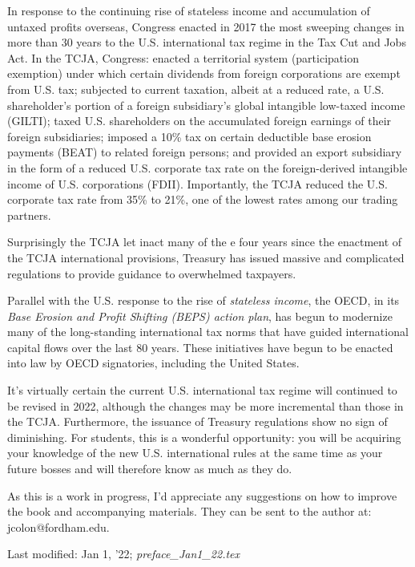 In response to the continuing rise of stateless income and accumulation of untaxed profits overseas, Congress enacted  in 2017 the most sweeping changes in more than 30 years to the U.S. international tax regime in the Tax Cut and Jobs Act.  In the TCJA, Congress: enacted a territorial system (participation exemption) under which certain dividends from foreign corporations are exempt from U.S. tax; subjected to current taxation, albeit at a reduced rate, a U.S. shareholder's portion of a foreign subsidiary's global intangible low-taxed income (GILTI); taxed U.S. shareholders on the accumulated foreign earnings of their foreign subsidiaries; imposed a 10\% tax on certain deductible base erosion payments (BEAT) to related foreign persons; and provided an export subsidiary in the form of a reduced U.S. corporate tax rate on the foreign-derived intangible income of U.S. corporations (FDII).  Importantly, the TCJA reduced the U.S. corporate tax rate from 35\% to 21\%, one of the lowest rates among our trading partners.  

Surprisingly the TCJA let inact many of the e four years since the enactment of the TCJA international provisions, Treasury has issued massive and complicated regulations to provide guidance to overwhelmed taxpayers.      

Parallel with the U.S. response to the rise of \emph{stateless income}, the OECD, in its \emph{Base Erosion and Profit Shifting (BEPS) action plan}, has begun to modernize many of the long-standing international tax norms that have guided international capital flows over the last 80 years.  These initiatives have begun to be enacted into law by OECD signatories, including the United States.

It's virtually certain the current U.S. international tax regime will continued to be revised in 2022, although the changes may be more incremental than those in the TCJA.  Furthermore, the issuance of Treasury regulations show no sign of diminishing.  For students, this is a wonderful opportunity:  you will be acquiring your knowledge of the new U.S. international rules at the same time as your future bosses and will therefore know as much as they do.   

As this is a work in progress, I'd appreciate any suggestions on how to improve the book and accompanying materials.  They can be sent to the author at:  jcolon@fordham.edu.    


\begin{framed}
Last modified:  Jan 1, '22; \emph{preface\_Jan1\_22.tex}
\end{framed}